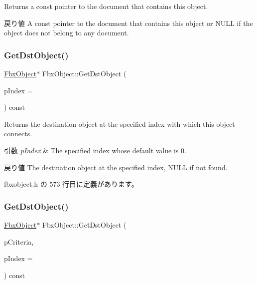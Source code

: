 Returns a const pointer to the document that contains this object. \begin{DoxyReturn}{戻り値}
A const pointer to the document that contains this object or {\ttfamily N\+U\+LL} if the object does not belong to any document. 
\end{DoxyReturn}
\mbox{\label{class_fbx_object_a3dcc740f7d5d22a73bb726c469b41c31}} 
\subsubsection{\texorpdfstring{Get\+Dst\+Object()}{GetDstObject()}\hspace{0.1cm}{\footnotesize\ttfamily [1/4]}}
{\footnotesize\ttfamily \hyperlink{class_fbx_object}{Fbx\+Object}$\ast$ Fbx\+Object\+::\+Get\+Dst\+Object (\begin{DoxyParamCaption}\item[{int}]{p\+Index = {} }\end{DoxyParamCaption}) const\hspace{0.3cm}{\ttfamily [inline]}}

Returns the destination object at the specified index with which this object connects. 
\begin{DoxyParams}{引数}
{\em p\+Index} & The specified index whose default value is 0. \\
\hline
\end{DoxyParams}
\begin{DoxyReturn}{戻り値}
The destination object at the specified index, N\+U\+LL if not found. 
\end{DoxyReturn}


 fbxobject.\+h の 573 行目に定義があります。

\mbox{\label{class_fbx_object_a353ab38d6dad42f974f9d1ab3372b4ce}} 
\subsubsection{\texorpdfstring{Get\+Dst\+Object()}{GetDstObject()}\hspace{0.1cm}{\footnotesize\ttfamily [2/4]}}
{\footnotesize\ttfamily \hyperlink{class_fbx_object}{Fbx\+Object}$\ast$ Fbx\+Object\+::\+Get\+Dst\+Object (\begin{DoxyParamCaption}\item[{const \hyperlink{class_fbx_criteria}{Fbx\+Criteria} \&}]{p\+Criteria,  }\item[{int}]{p\+Index = {} }\end{DoxyParamCaption}) const\hspace{0.3cm}{\ttfamily [inline]}}

